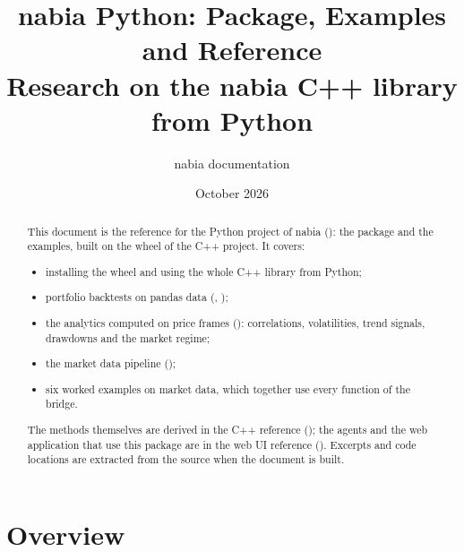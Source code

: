 \documentclass[11pt,a4paper]{article}
\title{nabia Python: Package, Examples and Reference\\[0.3em]
\large Research on the nabia C++ library from Python}
\author{nabia documentation}
\date{October 2026}
\begin{document}
\maketitle

\begin{abstract}
This document is the reference for the Python project of nabia (): the
 package and the examples, built on the  wheel of the C++
project. It covers:
\begin{itemize}
  \item installing the wheel and using the whole C++ library from Python;
  \item portfolio backtests on pandas data (, );
  \item the analytics computed on price frames (): correlations,
        volatilities, trend signals, drawdowns and the market regime;
  \item the market data pipeline ();
  \item six worked examples on market data, which together use every function of the bridge.
\end{itemize}
The methods themselves are derived in the C++ reference (); the agents and the web
application that use this package are in the web UI reference (). Excerpts and
code locations are extracted from the source when the document is built.
\end{abstract}

\tableofcontents
\clearpage
\part{Overview}
\end{document}
